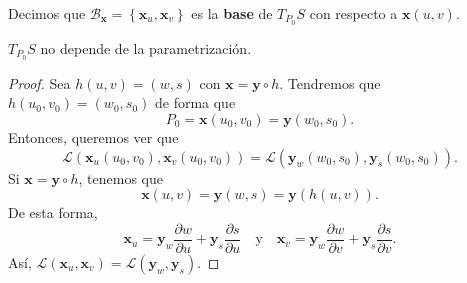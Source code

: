 \begin{definition}
	Decimos que $\displaystyle \mathcal{B}_{ \textbf{x} } = \left\{ \textbf{x} _{u}, \textbf{x} _{v}\right\}  $ es la \textbf{base} de $\displaystyle T_{P_{0}}S $ con respecto a $\displaystyle \textbf{x} \left(u,v\right) $. 
\end{definition}
\begin{prop}
$\displaystyle T_{P_{0}}S $ no depende de la parametrización.
\end{prop}
\begin{proof}
Sea $\displaystyle h\left(u,v\right)=\left(w,s\right) $ con $\displaystyle \textbf{x} = \textbf{y} \circ h $. Tendremos que $\displaystyle h\left(u_{0}, v_{0}\right)=\left(w_{0}, s_{0}\right) $ de forma que 
\[P_{0} = \textbf{x} \left(u_{0}, v_{0}\right)= \textbf{y} \left(w_{0}, s_{0}\right) .\]
Entonces, queremos ver que
\[ \mathcal{L}\left( \textbf{x} _{u}\left(u_{0}, v_{0}\right), \textbf{x} _{v}\left(u_{0}, v_{0}\right)\right)=\mathcal{L}\left( \textbf{y} _{w}\left(w_{0}, s_{0}\right), \textbf{y} _{s}\left(w_{0}, s_{0}\right)\right) .\]
Si $\displaystyle \textbf{x} = \textbf{y} \circ h $, tenemos que 
\[ \textbf{x} \left(u,v\right)= \textbf{y} \left(w,s\right)= \textbf{y} \left(h\left(u,v\right)\right) .\]
De esta forma, 
\[ \textbf{x} _{u}= \textbf{y} _{w}\frac{\partial w}{\partial u} + \textbf{y} _{s}\frac{\partial s}{\partial u} \quad \text{y} \quad \textbf{x} _{v} = \textbf{y} _{w}\frac{\partial w}{\partial v} + \textbf{y} _{s}\frac{\partial s}{\partial v}.\]
Así, $\displaystyle \mathcal{L}\left( \textbf{x} _{u}, \textbf{x} _{v}\right)= \mathcal{L}\left( \textbf{y} _{w}, \textbf{y} _{s}\right) $. 
\end{proof}

